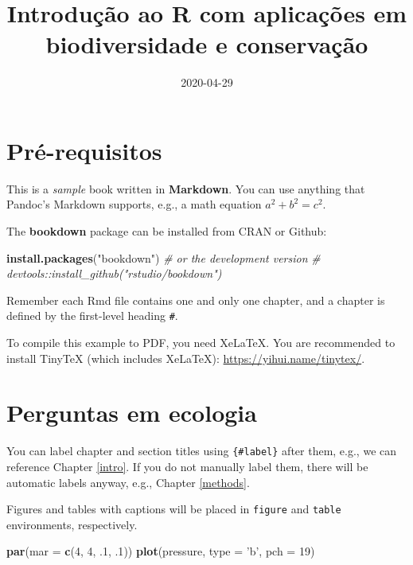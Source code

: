 \documentclass[]{book}
\title{Introdução ao R com aplicações em biodiversidade e conservação}
\author{}
\date{\vspace{-2.5em}2020-04-29}
\newenvironment{Shaded}{\begin{snugshade}}{\end{snugshade}}
\newcommand{\CommentTok}[1]{\textcolor[rgb]{0.56,0.35,0.01}{\textit{#1}}}
\newcommand{\DataTypeTok}[1]{\textcolor[rgb]{0.13,0.29,0.53}{#1}}
\newcommand{\DecValTok}[1]{\textcolor[rgb]{0.00,0.00,0.81}{#1}}
\newcommand{\FloatTok}[1]{\textcolor[rgb]{0.00,0.00,0.81}{#1}}
\newcommand{\KeywordTok}[1]{\textcolor[rgb]{0.13,0.29,0.53}{\textbf{#1}}}
\newcommand{\NormalTok}[1]{#1}
\newcommand{\StringTok}[1]{\textcolor[rgb]{0.31,0.60,0.02}{#1}}
\begin{document}
\maketitle

{
\setcounter{tocdepth}{1}
\tableofcontents
}
\hypertarget{pruxe9-requisitos}{%
\chapter{Pré-requisitos}\label{pruxe9-requisitos}}

This is a \emph{sample} book written in \textbf{Markdown}. You can use anything that Pandoc's Markdown supports, e.g., a math equation \(a^2 + b^2 = c^2\).

The \textbf{bookdown} package can be installed from CRAN or Github:

\begin{Shaded}
\begin{Highlighting}[]
\KeywordTok{install.packages}\NormalTok{(}\StringTok{"bookdown"}\NormalTok{)}
\CommentTok{# or the development version}
\CommentTok{# devtools::install_github("rstudio/bookdown")}
\end{Highlighting}
\end{Shaded}

Remember each Rmd file contains one and only one chapter, and a chapter is defined by the first-level heading \texttt{\#}.

To compile this example to PDF, you need XeLaTeX. You are recommended to install TinyTeX (which includes XeLaTeX): \url{https://yihui.name/tinytex/}.

\hypertarget{cap1}{%
\chapter{Perguntas em ecologia}\label{cap1}}

You can label chapter and section titles using \texttt{\{\#label\}} after them, e.g., we can reference Chapter \ref{intro}. If you do not manually label them, there will be automatic labels anyway, e.g., Chapter \ref{methods}.

Figures and tables with captions will be placed in \texttt{figure} and \texttt{table} environments, respectively.

\begin{Shaded}
\begin{Highlighting}[]
\KeywordTok{par}\NormalTok{(}\DataTypeTok{mar =} \KeywordTok{c}\NormalTok{(}\DecValTok{4}\NormalTok{, }\DecValTok{4}\NormalTok{, }\FloatTok{.1}\NormalTok{, }\FloatTok{.1}\NormalTok{))}
\KeywordTok{plot}\NormalTok{(pressure, }\DataTypeTok{type =} \StringTok{'b'}\NormalTok{, }\DataTypeTok{pch =} \DecValTok{19}\NormalTok{)}
\end{Highlighting}
\end{Shaded}
\end{document}

